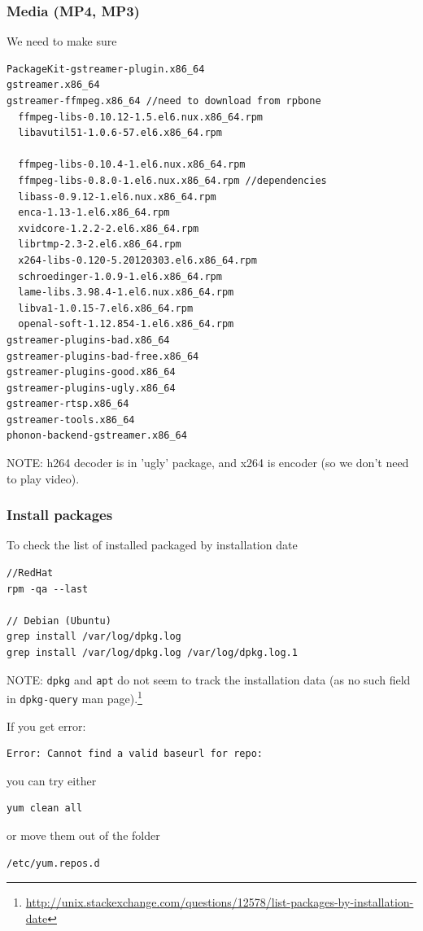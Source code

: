 \subsubsection{Media (MP4, MP3)}

We need to make sure
\begin{verbatim}
PackageKit-gstreamer-plugin.x86_64
gstreamer.x86_64
gstreamer-ffmpeg.x86_64 //need to download from rpbone
  ffmpeg-libs-0.10.12-1.5.el6.nux.x86_64.rpm
  libavutil51-1.0.6-57.el6.x86_64.rpm
  
  ffmpeg-libs-0.10.4-1.el6.nux.x86_64.rpm
  ffmpeg-libs-0.8.0-1.el6.nux.x86_64.rpm //dependencies
  libass-0.9.12-1.el6.nux.x86_64.rpm
  enca-1.13-1.el6.x86_64.rpm
  xvidcore-1.2.2-2.el6.x86_64.rpm
  librtmp-2.3-2.el6.x86_64.rpm
  x264-libs-0.120-5.20120303.el6.x86_64.rpm
  schroedinger-1.0.9-1.el6.x86_64.rpm
  lame-libs.3.98.4-1.el6.nux.x86_64.rpm
  libva1-1.0.15-7.el6.x86_64.rpm
  openal-soft-1.12.854-1.el6.x86_64.rpm
gstreamer-plugins-bad.x86_64
gstreamer-plugins-bad-free.x86_64
gstreamer-plugins-good.x86_64
gstreamer-plugins-ugly.x86_64
gstreamer-rtsp.x86_64
gstreamer-tools.x86_64
phonon-backend-gstreamer.x86_64
\end{verbatim}
NOTE: h264 decoder is in 'ugly' package, and x264 is encoder (so we don't need
to play video).



\subsubsection{Install packages}

To check the list of installed packaged by installation date
\begin{verbatim}
//RedHat 
rpm -qa --last

// Debian (Ubuntu)
grep install /var/log/dpkg.log
grep install /var/log/dpkg.log /var/log/dpkg.log.1

\end{verbatim}
NOTE: \verb!dpkg! and \verb!apt! do not seem to track the installation data (as
no such field in \verb!dpkg-query! man
page).\footnote{\url{http://unix.stackexchange.com/questions/12578/list-packages-by-installation-date}}

If you get error:
\begin{verbatim}
Error: Cannot find a valid baseurl for repo: 
\end{verbatim}
you can try either
\begin{verbatim}
yum clean all
\end{verbatim}
or move them out of the folder
\begin{verbatim}
/etc/yum.repos.d
\end{verbatim}

